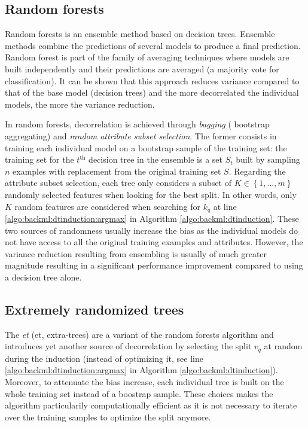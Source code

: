 \subsection{Random forests}
\label{ssec:backml:rf}

Random forests \parencite{breiman2001random} is an ensemble method based on decision
trees. Ensemble methods combine the predictions of several models to produce a
final prediction. Random forest is part of the family of averaging techniques
where models are built independently and their predictions are averaged (\eg a
majority vote for classification). It can be shown that this approach reduces
variance compared to that of the base model (\eg decision trees) and the more
decorrelated the individual models, the more the variance reduction.

In random forests, decorrelation is achieved through \textit{bagging} (\aka
bootstrap aggregating) and \textit{random attribute subset selection}. The former
consists in training each individual model on a bootstrap sample of the training
set: the training set for the $t^{\text{th}}$ decision tree in the ensemble is a
set $S_t$ built by sampling $n$ examples with replacement from the original training set $S$.
Regarding the attribute subset selection, each tree only considers a subset of
$K \in \left\{1,..., m\right\}$ randomly selected features when looking for the
best split. In other words, only $K$ random features are considered when searching
for $k_q$ at line \ref{algo:backml:dtinduction:argmax} in Algorithm
\ref{algo:backml:dtinduction}. These two sources of randomness usually increase
the bias as the individual models do not have access to all the original training
examples and attributes. However, the variance reduction resulting from ensembling
is usually of much greater magnitude resulting in a significant performance
improvement compared to using a decision tree alone.

\subsection{Extremely randomized trees}
\label{ssec:backml:et}

The \textit{\acrlong{et}} (\acrshort{et}, \aka extra-trees) \parencite{geurts2006extremely}
are a variant of the random forests algorithm and introduces yet another source
of decorrelation by selecting the split $v_q$ at random during the induction
(instead of optimizing it, see line \ref{algo:backml:dtinduction:argmax} in
Algorithm \ref{algo:backml:dtinduction}). Moreover, to attenuate the bias increase,
each individual tree is built on the whole training set instead of a boostrap
sample. These choices makes the algorithm particularily computationally efficient
as it is not necessary to iterate over the training samples to optimize the split
anymore.

